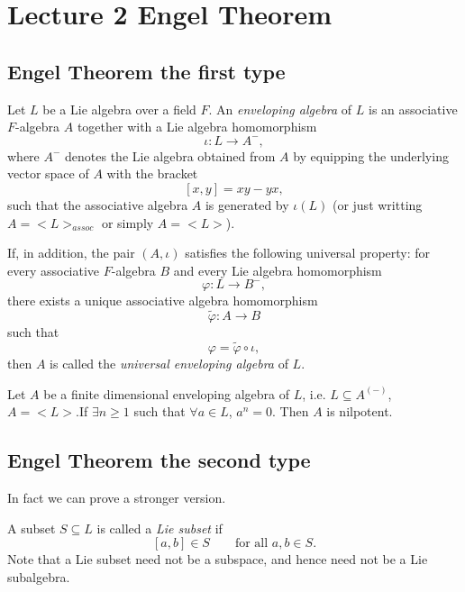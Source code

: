 \documentclass[11pt, a4paper]{report}
\begin{document}
\chapter{Lecture 2 Engel Theorem}

\section{Engel Theorem the first type}

\begin{definition}
    Let \(L\) be a Lie algebra over a field \(F\). An \emph{enveloping algebra} of \(L\) is an associative \(F\)-algebra \(A\) together with a Lie algebra homomorphism
    \[
    \iota:L\to A^{-},
    \]
    where \(A^{-}\) denotes the Lie algebra obtained from \(A\) by equipping the underlying vector space of \(A\) with the bracket
    \[
    [x,y]=xy-yx,
    \]
    such that the associative algebra \(A\) is generated by \(\iota(L)\) (or just writting $A=<L>_{assoc}$ or simply $A=<L>$).
    
    If, in addition, the pair \((A,\iota)\) satisfies the following universal property: for every associative \(F\)-algebra \(B\) and every Lie algebra homomorphism
    \[
    \varphi:L\to B^{-},
    \]
    there exists a unique associative algebra homomorphism
    \[
    \widetilde{\varphi}:A\to B
    \]
    such that
    \[
    \varphi=\widetilde{\varphi}\circ \iota,
    \]
    then \(A\) is called the \emph{universal enveloping algebra} of \(L\).
\end{definition}

\begin{theorem} 
Let $ A $ be a finite dimensional enveloping algebra of $L$, i.e. $ L\subseteq A^{(-)} $, $ A = <L> $.If $ \exists n \ge 1 $ such that $ \forall a \in L $, $ a^n=0 $. Then $ A $ is nilpotent.       
\end{theorem}

\section{Engel Theorem the second type}

In fact we can prove a stronger version.

\begin{definition}
    A subset $S\subseteq L$ is called a \emph{Lie subset} if
    \[
    [a,b]\in S
    \qquad
    \text{for all } a,b\in S.
    \]
    Note that a Lie subset need not be a subspace, and hence need not be a Lie subalgebra.
    \end{definition}
    
\end{document}
